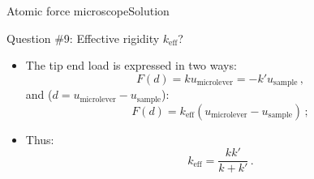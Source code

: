 \documentclass{beamer}
\newcommand{\uj}{u}
\begin{document}
\begin{frame}{Atomic force microscope}{Solution}

\vskip-30pt
\begin{exampleblock}{Question \#9: Effective rigidity $k_\text{eff}$?}
\begin{itemize}
\item The tip end load is expressed in two ways:
\begin{displaymath}
 F(d)=k\uj_\text{microlever}=-k'\uj_\text{sample}\,,
\end{displaymath}
and ($d=\uj_\text{microlever}-\uj_\text{sample}$):
\begin{displaymath}
 F(d)=k_\text{eff}(\uj_\text{microlever}-\uj_\text{sample})\,;
\end{displaymath}
\item Thus:
\begin{displaymath}
k_\text{eff}=\frac{kk'}{k+k'}\,.
\end{displaymath}
\end{itemize}
\end{exampleblock}

\end{frame}
\end{document}
